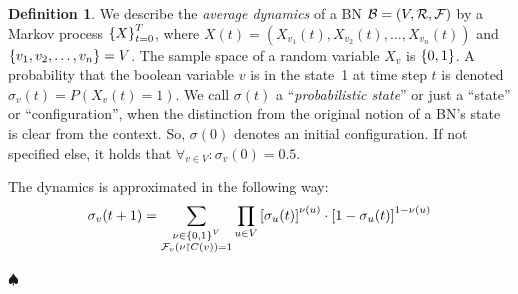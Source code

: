 \documentclass[
	digital, oneside, nosansbold, nocolorbold, nolot, nolof
]{fithesis4}
\theoremstyle{definition}
\newtheorem{definition}{Definition}
\theoremstyle{definition}
\newenvironment{ldefinition}
    {\begin{definition}}
	{\par\hspace{\stretch{1}}$\spadesuit$\hspace{\stretch{1}}
     \par\end{definition}}
\DeclarePairedDelimiter{\set}{\{}{\}}
\begin{document}
\begin{ldefinition}
We describe the \emph{average dynamics} of a BN $\mathcal{B} = (V, \mathcal{R},
\mathcal{F})$ by a Markov process $\set*{X}_{t = 0}^T$, where $X(t) =
(X_{v_1}(t), X_{v_2}(t), \ldots, X_{v_n}(t))$ and $\set{v_1, v_2, \ldots,
v_n} = V$. The sample space of a random variable $X_v$ is $\set{0, 1}$. A
probability that the boolean variable $v$ is in the state~1 at time step
$t$ is denoted $\sigma_{v}(t) = P(X_v(t) = 1)$. We call $\sigma(t)$ a
\enquote{\emph{probabilistic state}} or just a \enquote{state} or
\enquote{configuration}, when the distinction from the original notion of a
BN's state is clear from the context.  So, $\sigma(0)$ denotes an initial
configuration. If not specified else, it holds that $\forall_{v \in V} :
\sigma_v(0) = 0.5$.

The dynamics is approximated in the following way:
\begin{equation} \label{eq:ibmfa}
    \sigma_v(t + 1)
    = \sum_{\substack{\nu \in \set{0, 1}^V \\
            \BNUFs{F}_v(\nu\restriction C(v)) = 1}} 
        \prod_{u \in V}
            \left[ \sigma_u(t) \right]^{\nu(u)}
            \cdot \left[ 1 - \sigma_u(t) \right]^{1 - \nu(u)}
\end{equation}
\end{ldefinition}
\end{document}
